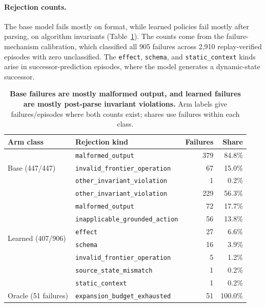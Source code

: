 \paragraph{Rejection counts.}
The base model fails mostly on format, while learned policies fail mostly after parsing, on algorithm invariants (Table~\ref{tab:appendix-rejection}). The counts come from the failure-mechanism calibration, which classified all 905 failures across 2,910 replay-verified episodes with zero unclassified. The \texttt{effect}, \texttt{schema}, and \texttt{static\_context} kinds arise in successor-prediction episodes, where the model generates a dynamic-state successor.

\begin{table}[t]
\caption{\textbf{Base failures are mostly malformed output, and learned failures are mostly post-parse invariant violations.} Arm labels give failures/episodes where both counts exist; shares use failures within each class.}
\label{tab:appendix-rejection}
\centering\footnotesize
\setlength{\tabcolsep}{4pt}
\begin{tabular}{llrr}
\toprule[0.4mm]
\rowcolor{mygray}\textbf{Arm class} & \textbf{Rejection kind} & \textbf{Failures} & \textbf{Share} \\
\midrule
\multirow{3}{*}{Base (447/447)} & \texttt{malformed\_output} & 379 & 84.8\% \\
 & \texttt{invalid\_frontier\_operation} & 67 & 15.0\% \\
 & \texttt{other\_invariant\_violation} & 1 & 0.2\% \\
\midrule
\multirow{8}{*}{Learned (407/906)} & \texttt{other\_invariant\_violation} & 229 & 56.3\% \\
 & \texttt{malformed\_output} & 72 & 17.7\% \\
 & \texttt{inapplicable\_grounded\_action} & 56 & 13.8\% \\
 & \texttt{effect} & 27 & 6.6\% \\
 & \texttt{schema} & 16 & 3.9\% \\
 & \texttt{invalid\_frontier\_operation} & 5 & 1.2\% \\
 & \texttt{source\_state\_mismatch} & 1 & 0.2\% \\
 & \texttt{static\_context} & 1 & 0.2\% \\
\midrule
Oracle (51 failures) & \texttt{expansion\_budget\_exhausted} & 51 & 100.0\% \\
\bottomrule
\end{tabular}
\end{table}


